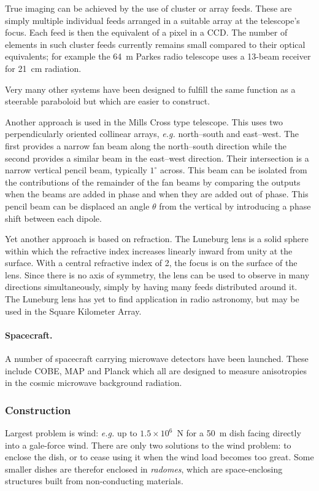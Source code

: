 \documentclass{article}
\begin{document}
True imaging can be achieved by the use of cluster or array feeds. 
These are simply multiple individual feeds arranged in a suitable array at
the telescope's focus. Each feed is then the equivalent of a pixel in a CCD.
The number of elements in such cluster feeds currently remains small compared
to their optical equivalents; for example the 64~m Parkes radio telescope
uses a 13-beam receiver for 21~cm radiation. 

Very many other systems have been designed to fulfill the same function as
a steerable paraboloid but which are easier to construct. 

Another approach is used in the Mills Cross type telescope. This uses
two perpendicularly oriented collinear arrays, {\it e.g.} 
north--south and east--west. The first provides a
narrow fan beam along the north--south direction while the second provides a similar 
beam in the east--west direction. Their intersection is a narrow vertical pencil beam, 
typically $1^{\circ}$ across. This beam can be isolated from the contributions of the 
remainder of the fan beams by comparing the outputs when the beams are added 
in phase and when they are added out of phase. This pencil beam can be displaced
an angle $\theta$ from the vertical by introducing a phase shift between each dipole.

Yet another approach is based on refraction. The Luneburg lens is a solid sphere 
within which the refractive index increases linearly inward from unity at the surface.
With a central refractive index of 2, the focus is on the surface of the lens. Since there
is no axis of symmetry, the lens can be used to observe in many directions simultaneously,
simply by having many feeds distributed around it. The Luneburg lens has yet to 
find application in radio astronomy, but may be used in the Square Kilometer Array.

\paragraph{Spacecraft.} A number of spacecraft carrying microwave detectors have been launched. 
These include COBE, MAP and Planck which all are designed to measure anisotropies in
 the cosmic microwave background radiation.

\subsubsection{Construction}

Largest problem is wind: {\it e.g.} up to $1.5\times 10^6$~N for a 50~m dish 
facing directly into a gale-force wind. There are only two solutions to the wind problem:
to enclose the dish, or to cease using it when the wind load becomes too great. Some 
smaller dishes are therefor enclosed in {\it radomes}, which are space-enclosing structures
built from non-conducting materials.
\end{document}
